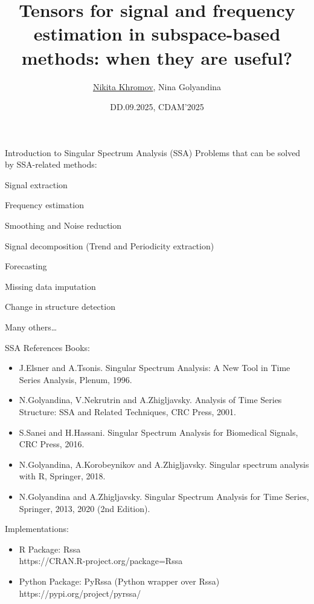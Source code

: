 \documentclass[pdf, unicode, ucs, notheorems]{beamer}
\title[Tensor SSA]{Tensors for signal and frequency estimation in
subspace-based methods: when they are useful?}
\author[Khromov N., Golyandina N.]{\texorpdfstring{\underline{Nikita
Khromov}}{Nikita Khromov}, Nina Golyandina}
\institute[SPbU]{%
  \small
  \vspace{0.2cm}\\
  St.\,Petersburg State University\\
  Department of Statistical Modeling\\
  \vspace{0.1cm}
}
\date{\small DD.09.2025, CDAM'2025}
\newcommand{\bluetext}[1]{{\usebeamercolor[fg]{bluetext_color}#1}}
\theoremstyle{definition}
\begin{document}
\begin{frame}[plain]
  \titlepage
\end{frame}

\begin{frame}{Introduction to Singular Spectrum Analysis (SSA)}
  Problems that can be solved by SSA-related methods:
  \begin{itemize}
      \bluetext{
      \item Signal extraction
      \item Frequency estimation
      }
    \item Smoothing and Noise reduction
    \item Signal decomposition (Trend and Periodicity extraction)
    \item Forecasting
    \item Missing data imputation
    \item Change in structure detection
    \item Many others\dots
  \end{itemize}

\end{frame}

\begin{frame}{SSA References}
  Books:
  \begin{itemize}
    \item J.Elsner and A.Tsonis. Singular Spectrum Analysis: A New Tool in
      Time Series Analysis, Plenum, 1996.
    \item N.Golyandina, V.Nekrutrin and A.Zhigljavsky. Analysis of Time
      Series Structure: SSA and Related Techniques, CRC Press, 2001.
    \item S.Sanei and H.Hassani. Singular Spectrum Analysis for Biomedical
      Signals, CRC Press, 2016.
    \item N.Golyandina, A.Korobeynikov and A.Zhigljavsky. Singular spectrum
      analysis with R, Springer, 2018.
    \item N.Golyandina and A.Zhigljavsky. Singular Spectrum Analysis for
      Time Series, Springer, 2013, 2020 (2nd Edition).
  \end{itemize}

  \bigskip

  Implementations:
  \begin{itemize}
    \item R Package: Rssa \\
      \hspace{2ex} https://CRAN.R-project.org/package=Rssa
    \item Python Package: PyRssa (Python wrapper over Rssa) \\
      \hspace{2ex} https://pypi.org/project/pyrssa/
  \end{itemize}
\end{frame}
\end{document}
